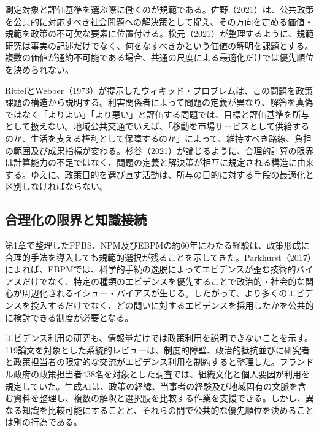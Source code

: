 測定対象と評価基準を選ぶ際に働くのが規範である。佐野（2021）は、公共政策を公共的に対応すべき社会問題への解決策として捉え、その方向を定める価値・規範を政策の不可欠な要素に位置付ける\cite{sano2021_ch1}。松元（2021）が整理するように、規範研究は事実の記述だけでなく、何をなすべきかという価値の解明を課題とする\cite{matsumoto2021}。複数の価値が通約不可能である場合、共通の尺度による最適化だけでは優先順位を決められない\cite{sano2021_ch8}。

RittelとWebber（1973）が提示したウィキッド・プロブレムは、この問題を政策課題の構造から説明する\cite{rittel1973}。利害関係者によって問題の定義が異なり、解答を真偽ではなく「よりよい」「より悪い」と評価する問題では、目標と評価基準を所与として扱えない\cite{okuda2019howlett}。地域公共交通でいえば、「移動を市場サービスとして供給するのか、生活を支える権利として保障するのか」によって、維持すべき路線、負担の範囲及び成果指標が変わる。杉谷（2021）が論じるように、合理的計算の限界は計算能力の不足ではなく、問題の定義と解決策が相互に規定される構造に由来する\cite{sugitani2021wicked}。ゆえに、政策目的を選び直す活動は、所与の目的に対する手段の最適化と区別しなければならない。

\subsection{合理化の限界と知識接続}

第1章で整理したPPBS、NPM及びEBPMの約60年にわたる経験は、政策形成に合理的手法を導入しても規範的選択が残ることを示してきた\cite{sugitani2024naze,sanderson2002evidence}。Parkhurst（2017）によれば、EBPMでは、科学的手続の逸脱によってエビデンスが歪む技術的バイアスだけでなく、特定の種類のエビデンスを優先することで政治的・社会的な関心が周辺化されるイシュー・バイアスが生じる\cite{parkhurst2017politics}。したがって、より多くのエビデンスを投入するだけでなく、どの問いに対するエビデンスを採用したかを公共的に検討できる制度が必要となる。

エビデンス利用の研究も、情報量だけでは政策利用を説明できないことを示す。119論文を対象とした系統的レビューは、制度的障壁、政治的抵抗並びに研究者と政策担当者の限定的な交流がエビデンス利用を制約すると整理した\cite{suazogaldames2025systematic}。フランドル政府の政策担当者438名を対象とした調査では、組織文化と個人要因が利用を規定していた\cite{raymaekers2026organizational}。生成AIは、政策の経緯、当事者の経験及び地域固有の文脈を含む資料を整理し、複数の解釈と選択肢を比較する作業を支援できる。しかし、異なる知識を比較可能にすることと、それらの間で公共的な優先順位を決めることは別の行為である。

